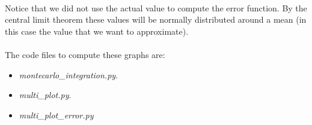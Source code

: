 \documentclass{article}
\begin{document}
\paragraph{} Notice that we did not use the actual value to compute the error function. By the central limit theorem these values will be normally distributed around a mean (in this case the value that we want to approximate).
\paragraph{} The code files to compute these graphs are:
\begin{itemize}
	\item \textit{montecarlo\_integration.py}.
	\item \textit{multi\_plot.py}.
	\item \textit{multi\_plot\_error.py}
\end{itemize}
\end{document}
